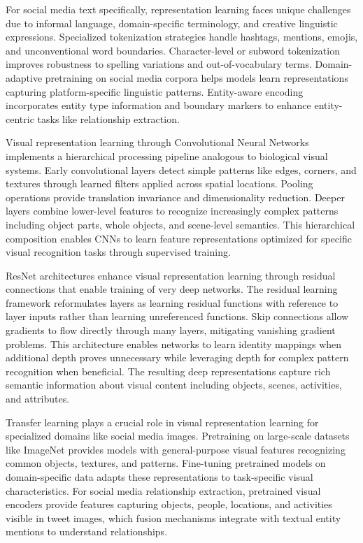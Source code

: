 \documentclass[12pt,a4paper]{report}
\begin{document}
For social media text specifically, representation learning faces unique challenges due to informal language, domain-specific terminology, and creative linguistic expressions. Specialized tokenization strategies handle hashtags, mentions, emojis, and unconventional word boundaries. Character-level or subword tokenization improves robustness to spelling variations and out-of-vocabulary terms. Domain-adaptive pretraining on social media corpora helps models learn representations capturing platform-specific linguistic patterns. Entity-aware encoding incorporates entity type information and boundary markers to enhance entity-centric tasks like relationship extraction.

Visual representation learning through Convolutional Neural Networks implements a hierarchical processing pipeline analogous to biological visual systems. Early convolutional layers detect simple patterns like edges, corners, and textures through learned filters applied across spatial locations. Pooling operations provide translation invariance and dimensionality reduction. Deeper layers combine lower-level features to recognize increasingly complex patterns including object parts, whole objects, and scene-level semantics. This hierarchical composition enables CNNs to learn feature representations optimized for specific visual recognition tasks through supervised training.

ResNet architectures enhance visual representation learning through residual connections that enable training of very deep networks. The residual learning framework reformulates layers as learning residual functions with reference to layer inputs rather than learning unreferenced functions. Skip connections allow gradients to flow directly through many layers, mitigating vanishing gradient problems. This architecture enables networks to learn identity mappings when additional depth proves unnecessary while leveraging depth for complex pattern recognition when beneficial. The resulting deep representations capture rich semantic information about visual content including objects, scenes, activities, and attributes.

Transfer learning plays a crucial role in visual representation learning for specialized domains like social media images. Pretraining on large-scale datasets like ImageNet provides models with general-purpose visual features recognizing common objects, textures, and patterns. Fine-tuning pretrained models on domain-specific data adapts these representations to task-specific visual characteristics. For social media relationship extraction, pretrained visual encoders provide features capturing objects, people, locations, and activities visible in tweet images, which fusion mechanisms integrate with textual entity mentions to understand relationships.
\end{document}
